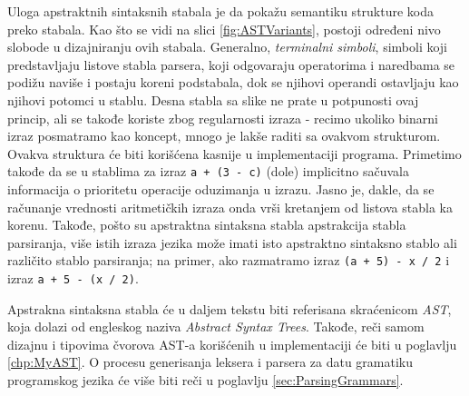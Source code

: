 Uloga apstraktnih sintaksnih stabala je da pokažu semantiku strukture koda preko stabala. Kao što se vidi na slici \ref{fig:ASTVariants}, postoji određeni nivo slobode u dizajniranju ovih stabala. Generalno, \emph{terminalni simboli}, simboli koji predstavljaju listove stabla parsera, koji odgovaraju operatorima i naredbama se podižu naviše i postaju koreni podstabala, dok se njihovi operandi ostavljaju kao njihovi potomci u stablu. Desna stabla sa slike ne prate u potpunosti ovaj princip, ali se takođe koriste zbog regularnosti izraza - recimo ukoliko binarni izraz posmatramo kao koncept, mnogo je lakše raditi sa ovakvom strukturom. Ovakva struktura će biti korišćena kasnije u implementaciji programa. Primetimo takođe da se u stablima za izraz \texttt{a + (3 - c)} (dole) implicitno sačuvala informacija o prioritetu operacije oduzimanja u izrazu. Jasno je, dakle, da se računanje vrednosti aritmetičkih izraza onda vrši kretanjem od listova stabla ka korenu. Takođe, pošto su apstraktna sintaksna stabla apstrakcija stabla parsiranja, više istih izraza jezika može imati isto apstraktno sintaksno stablo ali različito stablo parsiranja; na primer, ako razmatramo izraz \texttt{(a + 5) - x / 2} i izraz \texttt{a + 5 - (x / 2)}.

Apstrakna sintaksna stabla će u daljem tekstu biti referisana skraćenicom \emph{AST}, koja dolazi od engleskog naziva \emph{Abstract Syntax Trees}. Takođe, reči samom dizajnu i tipovima čvorova AST-a korišćenih u implementaciji će biti u poglavlju \ref{chp:MyAST}. O procesu generisanja leksera i parsera za datu gramatiku programskog jezika će više biti reči u poglavlju \ref{sec:ParsingGrammars}.